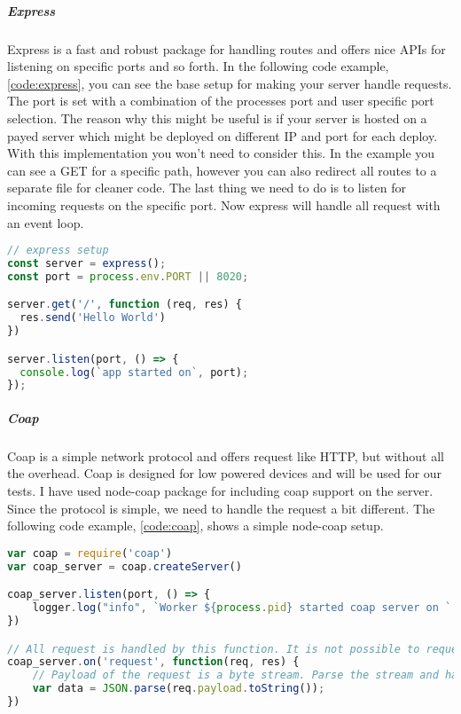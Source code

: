 \documentclass[USenglish]{ifimaster}  %
\begin{document}
\subparagraph{Express}
Express is a fast and robust package for handling routes and offers nice APIs for listening on specific ports and so forth. In the following code example, \vref{code:express}, you can see the base setup for making your server handle requests. The port is set with a combination of the processes port and user specific port selection. The reason why this might be useful is if your server is hosted on a payed server which might be deployed on different IP and port for each deploy. With this implementation you won't need to consider this. In the example you can see a GET for a specific path, however you can also redirect all routes to a separate file for cleaner code. The last thing we need to do is to listen for incoming requests on the specific port. Now express will handle all request with an event loop.

\begin{lstlisting}[caption={Base express setup},label={code:express},language=JavaScript]
// express setup
const server = express();
const port = process.env.PORT || 8020;

server.get('/', function (req, res) {
  res.send('Hello World')
})

server.listen(port, () => {
  console.log(`app started on`, port);
});
\end{lstlisting}

\subparagraph{Coap} %
Coap is a simple network protocol and offers request like HTTP, but without all the overhead. Coap is designed for low powered devices and will be used for our tests. I have used node-coap package for including coap support on the server. Since the protocol is simple, we need to handle the request a bit different. The following code example, \vref{code:coap}, shows a simple node-coap setup.

\begin{lstlisting}[caption={Base coap setup},label={code:coap},language=JavaScript]
var coap = require('coap')
var coap_server = coap.createServer()

coap_server.listen(port, () => {
    logger.log("info", `Worker ${process.pid} started coap server on ` + port);
})

// All request is handled by this function. It is not possible to request a specific url path
coap_server.on('request', function(req, res) {
    // Payload of the request is a byte stream. Parse the stream and handle the data
    var data = JSON.parse(req.payload.toString());
})
\end{lstlisting}
\end{document}
